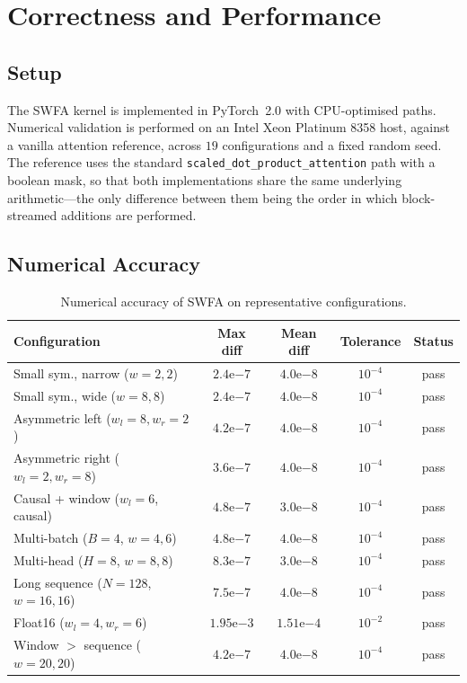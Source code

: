 \section{Correctness and Performance}\label{sec:swfa_results}

\subsection{Setup}\label{sec:swfa_setup}
The SWFA kernel is implemented in PyTorch~2.0 with CPU-optimised
paths. Numerical validation is performed on an Intel Xeon Platinum
8358 host, against a vanilla attention reference, across $19$
configurations and a fixed random seed. The reference uses the
standard \texttt{scaled\_dot\_product\_attention} path with a
boolean mask, so that both implementations share the same
underlying arithmetic---the only difference between them being the
order in which block-streamed additions are performed.

\subsection{Numerical Accuracy}\label{sec:swfa_accuracy}
\begin{table}[h]
\centering
\caption{Numerical accuracy of SWFA on representative configurations.}
\label{tab:swfa_accuracy}
\begin{tabular}{lcccc}
\toprule
\textbf{Configuration} & \textbf{Max diff} & \textbf{Mean diff} & \textbf{Tolerance} & \textbf{Status} \\
\midrule
Small sym., narrow ($w{=}2,2$)    & $2.4\mathrm{e}{-7}$ & $4.0\mathrm{e}{-8}$ & $10^{-4}$ & pass \\
Small sym., wide   ($w{=}8,8$)    & $2.4\mathrm{e}{-7}$ & $4.0\mathrm{e}{-8}$ & $10^{-4}$ & pass \\
Asymmetric left    ($w_l{=}8, w_r{=}2$) & $4.2\mathrm{e}{-7}$ & $4.0\mathrm{e}{-8}$ & $10^{-4}$ & pass \\
Asymmetric right   ($w_l{=}2, w_r{=}8$) & $3.6\mathrm{e}{-7}$ & $4.0\mathrm{e}{-8}$ & $10^{-4}$ & pass \\
Causal + window    ($w_l{=}6$, causal)  & $4.8\mathrm{e}{-7}$ & $3.0\mathrm{e}{-8}$ & $10^{-4}$ & pass \\
Multi-batch ($B{=}4$, $w{=}4,6$)        & $4.8\mathrm{e}{-7}$ & $4.0\mathrm{e}{-8}$ & $10^{-4}$ & pass \\
Multi-head ($H{=}8$, $w{=}8,8$)         & $8.3\mathrm{e}{-7}$ & $3.0\mathrm{e}{-8}$ & $10^{-4}$ & pass \\
Long sequence ($N{=}128$, $w{=}16,16$)  & $7.5\mathrm{e}{-7}$ & $4.0\mathrm{e}{-8}$ & $10^{-4}$ & pass \\
Float16 ($w_l{=}4, w_r{=}6$)            & $1.95\mathrm{e}{-3}$ & $1.51\mathrm{e}{-4}$ & $10^{-2}$ & pass \\
Window $>$ sequence ($w{=}20,20$)       & $4.2\mathrm{e}{-7}$ & $4.0\mathrm{e}{-8}$ & $10^{-4}$ & pass \\
\bottomrule
\end{tabular}
\end{table}

